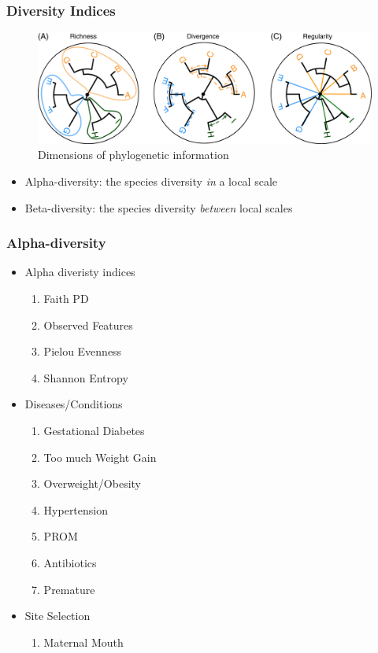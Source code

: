 \documentclass{beamer}
\begin{document}
    \begin{frame}
        \frametitle{Diversity Indices}

        \begin{figure}
            \includegraphics[width=0.8 \linewidth]{figures/phylogenic.jpg}
            \caption{Dimensions of phylogenetic information \protect\cite{phylogenetic1}}
        \end{figure}

        \begin{itemize}
            \item Alpha-diversity: the species diversity \textit{in} a local scale
            \item Beta-diversity: the species diversity \textit{between} local scales
        \end{itemize}
    \end{frame}

    \begin{frame}
        \frametitle{Alpha-diversity}

        \begin{itemize}
            \item Alpha diveristy indices
            \begin{enumerate}
                \item Faith PD
                \item Observed Features
                \item Pielou Evenness
                \item Shannon Entropy
            \end{enumerate}

            \item Diseases/Conditions
            \begin{enumerate}
                \item Gestational Diabetes
                \item Too much Weight Gain
                \item Overweight/Obesity
                \item Hypertension
                \item PROM
                \item Antibiotics
                \item Premature
            \end{enumerate}

            \item Site Selection
            \begin{enumerate}
                \item Maternal Mouth
            \end{enumerate}
        \end{itemize}
    \end{frame}
\end{document}
